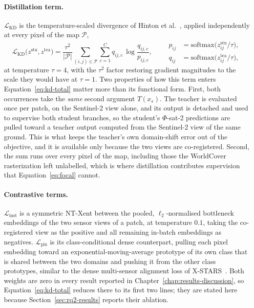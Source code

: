 \paragraph{Distillation term.}
$\mathcal{L}_{\mathrm{KD}}$ is the temperature-scaled  divergence of Hinton et al.~\cite{hinton2015distilling}, applied independently at every pixel of the map $\mathcal{P}$,
\begin{equation}
    \mathcal{L}_{\mathrm{KD}}\big(z^{\text{stu}}, z^{\text{tea}}\big) = \frac{\tau^{2}}{|\mathcal{P}|}
    \sum_{(i,j) \in \mathcal{P}} \sum_{c=1}^{C} q_{ij,c} \, \log \frac{q_{ij,c}}{p_{ij,c}},
    \qquad
    \begin{aligned}
        p_{ij} & = \mathrm{softmax}\big(z^{\text{stu}}_{ij} / \tau\big), \\
        q_{ij} & = \mathrm{softmax}\big(z^{\text{tea}}_{ij} / \tau\big),
    \end{aligned}
    \label{eq:kd-kl}
\end{equation}
at temperature $\tau = 4$, with the $\tau^{2}$ factor restoring gradient magnitudes to the scale they would have at $\tau = 1$.
Two properties of how this term enters Equation~\eqref{eq:kd-total} matter more than its functional form.
First, both occurrences take the \emph{same} second argument $T(x_s)$.
The teacher is evaluated once per patch, on the Sentinel-2 view alone, and its output is detached and used to supervise both student branches, so the student's $\Phi$-sat-2 predictions are pulled toward a teacher output computed from the Sentinel-2 view of the same ground.
This is what keeps the teacher's own domain-shift error out of the objective, and it is available only because the two views are co-registered.
Second, the sum runs over every pixel of the map, including those the WorldCover rasterization left unlabelled, which is where distillation contributes supervision that Equation~\eqref{eq:focal} cannot.

\paragraph{Contrastive terms.}
$\mathcal{L}_{\mathrm{inst}}$ is a symmetric NT-Xent between the pooled, $\ell_2$-normalised bottleneck embeddings of the two sensor views of a patch, at temperature $0.1$, taking the co-registered view as the positive and all remaining in-batch embeddings as negatives.
$\mathcal{L}_{\mathrm{pix}}$ is its class-conditional dense counterpart, pulling each pixel embedding toward an exponential-moving-average prototype of its own class that is shared between the two domains and pushing it from the other class prototypes, similar to the dense multi-sensor alignment loss of X-STARS~\cite{marsocci2025cross}.
Both weights are zero in every result reported in Chapter~\ref{chap:results-discussion}, so Equation~\eqref{eq:kd-total} reduces there to its first two lines; they are stated here because Section~\ref{sec:rq2-results} reports their ablation.

